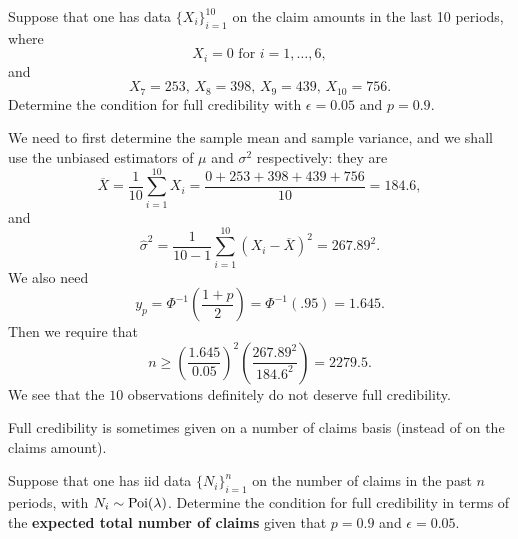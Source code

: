 \documentclass[notoc,notitlepage]{tufte-book}
\begin{document}
\begin{eg}
  Suppose that one has data $\{ X_i \}_{i=1}^{10}$ on the claim amounts in the
  last 10 periods, where
  \begin{equation*}
    X_i = 0 \text{ for } i = 1, \ldots, 6,
  \end{equation*}
  and
  \begin{equation*}
    X_7 = 253,\, X_8 = 398,\, X_9 = 439,\, X_{10} = 756.
  \end{equation*}
  Determine the condition for full credibility with $\epsilon = 0.05$ and $p =
  0.9$.
\end{eg}

\begin{solution}
  We need to first determine the sample mean and sample variance, and we shall
  use the unbiased estimators of $\mu$ and $\sigma^2$ respectively: they are
  \begin{equation*}
    \overline{X} = \frac{1}{10} \sum_{i=1}^{10} X_i = \frac{0 + 253 + 398 + 439 +
    756}{10} = 184.6,
  \end{equation*}
  and
  \begin{equation*}
    \hat{\sigma}^2 = \frac{1}{10-1} \sum_{i=1}^{10} (X_i - \overline{X})^2 =
    267.89^2.
  \end{equation*}
  We also need
  \begin{equation*}
    y_p = \Phi^{-1} \left( \frac{1 + p}{2} \right) = \Phi^{-1} (.95) = 1.645.
  \end{equation*}
  Then we require that
  \begin{equation*}
    n \geq \left( \frac{1.645}{0.05} \right)^2 \left( \frac{267.89^2}{184.6^2}
    \right) = 2279.5.
  \end{equation*}
  We see that the $10$ observations definitely do not deserve full credibility.
\end{solution}

Full credibility is sometimes given on a number of claims basis (instead of on
the claims amount).

\begin{eg}\label{eq:simple_example_for_full_cred_with_poisson}
  Suppose that one has iid data $\{ N_i \}_{i=1}^n$ on the number of claims in
  the past $n$ periods, with $N_i \sim \operatorname{Poi}(\lambda)$. Determine the condition
  for full credibility in terms of the \textbf{expected total number of claims}
  given that $p = 0.9$ and $\epsilon = 0.05$.
\end{eg}
\end{document}
